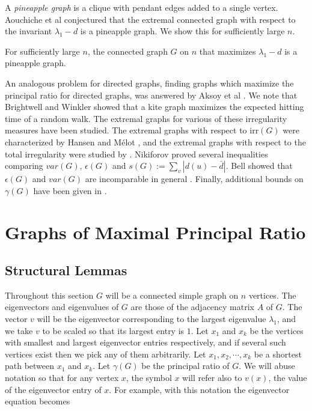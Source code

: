 A \textit{pineapple graph} is a clique with pendant edges added to a single vertex.
Aouchiche et al \cite{AouchicheEtAl2008} conjectured that the extremal connected
graph with respect to the invariant $\lambda_1 - d$ is a pineapple graph.  We
show this for sufficiently large $n$.
\begin{theorem}\label{main_theorem}
  For sufficiently large $n$, the connected graph $G$ on $n$
  that maximizes $\lambda_1 - d$ is a pineapple graph.
\end{theorem}



An analogous problem for directed graphs, finding graphs which maximize the
principal ratio for directed graphs, was answered by Aksoy et al \cite{AksoyEtAl2016}.
We note that Brightwell and Winkler \cite{BrightwellWinkler1990} showed that
a kite graph maximizes the expected hitting time of a random walk.
The extremal graphs for various of these irregularity measures have been
studied.  
The extremal graphs with respect to $\textrm{irr}(G)$
were characterized by Hansen and M\'elot \cite{HansenMelot2002},
and the extremal graphs with respect to the total irregularity
were studied by \cite{Abdo2014}.
Nikiforov \cite{Nikiforov2006} proved several inequalities comparing
$var(G)$, $\epsilon(G)$ and $s(G) := \sum_v |d(u) - \bar{d}|$.  
Bell showed that $\epsilon(G)$ and $var(G)$ are incomparable in general
\cite{Bell1992}.  Finally, additional bounds on $\gamma(G)$ have been given in
\cite{CioabaGregory2007, PapendieckRecht2000, Minc1970, Latham1995, Zhang2005}.


\section{Graphs of Maximal Principal Ratio}

\subsection{Structural Lemmas}

Throughout this section $G$ will be a connected simple graph on $n$ vertices.
The eigenvectors and eigenvalues of $G$ are those of the adjacency
matrix $A$ of $G$.  The vector $v$ will be the eigenvector corresponding
to the largest eigenvalue $\lambda_1$,  and we take $v$ to be scaled
so that its largest entry is $1$.  Let $x_1$ and $x_k$
be the vertices with smallest and largest eigenvector entries respectively, and
if several such vertices exist then we pick any of them arbitrarily.
Let $x_1, x_2, \cdots, x_k$ be a shortest path between $x_1$ and
$x_k$.  Let $\gamma(G)$ be the principal ratio of $G$.  We will abuse
notation so that for any vertex $x$, the symbol $x$ will refer also to $v(x)$,
the value of the eigenvector entry of $x$.  For example, with this notation
the eigenvector equation becomes

